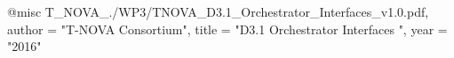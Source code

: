 @misc{ T_NOVA_./WP3/TNOVA_D3.1_Orchestrator_Interfaces_v1.0.pdf,
       author = "T-NOVA Consortium",
       title = "D3.1 Orchestrator Interfaces ",
       year = "2016" }
